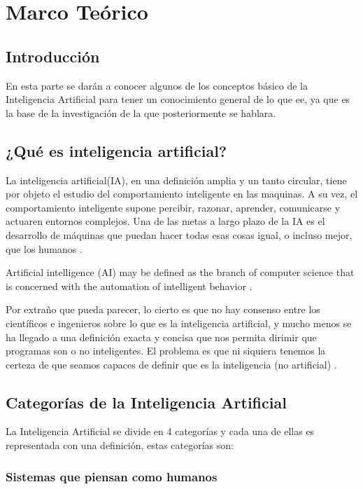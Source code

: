 
\chapter{Marco Te\'orico}
\section{Introducci\'on}
En esta parte se dar\'an a conocer algunos de los conceptos b\'asico de la Inteligencia Artificial para tener un conocimiento general de lo que ee, ya que es la base de la investigaci\'on de la que posteriormente se hablara.

\section{¿Qu\'e es inteligencia artificial?}

La inteligencia artificial(IA), en una definici\'on amplia y un tanto circular, tiene por objeto el estudio del comportamiento inteligente en las maquinas. A su vez, el comportamiento inteligente supone percibir, razonar, aprender, comunicarse y actuaren entornos complejos. Una de las metas a largo plazo de la IA es el desarrollo de m\'aquinas que puedan hacer todas esas cosas igual, o incluso mejor, que los humanos \citep{Sintesis}.\bigskip

Artificial intelligence (AI) may be defined as the branch of computer science that is concerned with the automation of intelligent behavior \citep{Structures}.\bigskip

Por extra\~no que pueda parecer, lo cierto es que no hay consenso entre los científicos e ingenieros sobre lo que es la inteligencia artificial, y mucho menos se ha llegado a una definici\'on exacta y concisa que nos permita dirimir que programas son o no inteligentes. El problema es que ni siquiera tenemos la certeza de que seamos capaces de definir que es la inteligencia (no artificial) \citep{Fundamentos}. \bigskip

\section{Categor\'ias de la Inteligencia Artificial}

La Inteligencia Artificial se divide en 4 categorías y cada una de ellas es representada con una definición, estas categorías son: \bigskip

\subsection{Sistemas que piensan como humanos}

